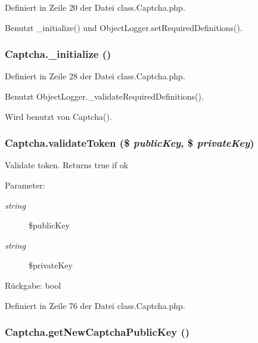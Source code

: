 Definiert in Zeile 20 der Datei class.Captcha.php.

Benutzt \_\-initialize() und ObjectLogger.setRequiredDefinitions().
\subsubsection{\setlength{\rightskip}{0pt plus 5cm}Captcha.\_\-initialize ()}\label{classCaptcha_67b9ec6afec78d8f2e710256cc365dd9}




Definiert in Zeile 28 der Datei class.Captcha.php.

Benutzt ObjectLogger.\_\-validateRequiredDefinitions().

Wird benutzt von Captcha().
\subsubsection{\setlength{\rightskip}{0pt plus 5cm}Captcha.validateToken (\$ {\em publicKey}, \$ {\em privateKey})}\label{classCaptcha_29247379025c1941a94caffa0987dc10}


Validate token. Returns true if ok

\begin{Desc}
\item[Parameter:]
\begin{description}
\item[{\em string}]\$publicKey \item[{\em string}]\$privateKey \end{description}
\end{Desc}
\begin{Desc}
\item[Rückgabe:]bool \end{Desc}


Definiert in Zeile 76 der Datei class.Captcha.php.
\subsubsection{\setlength{\rightskip}{0pt plus 5cm}Captcha.getNewCaptchaPublicKey ()}\label{classCaptcha_4a134ff3b1991b93378b75aacbdee8c2}




